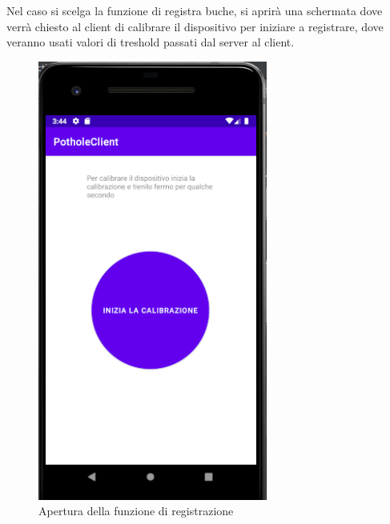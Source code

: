 \documentclass[a4paper,11pt]{report}
\begin{document}
Nel caso si scelga la funzione di registra buche, si aprirà una schermata dove verrà chiesto al client di calibrare il dispositivo per iniziare a registrare, dove veranno usati valori di treshold passati dal server al client.
\begin{figure} [H]
\centering
\includegraphics[scale = 0.65]{start_calibration_screen}
\caption{Apertura della funzione di registrazione}
\end{figure}
\end{document}
